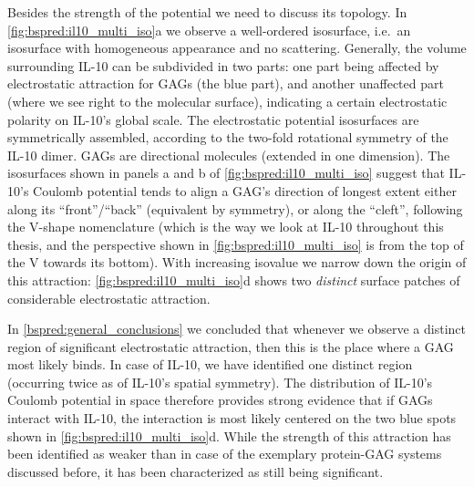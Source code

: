 Besides the strength of the potential we need to discuss its topology. In
\cref{fig:bspred:il10_multi_iso}a we observe a well-ordered isosurface, i.e.\ an
isosurface with homogeneous appearance and no scattering. Generally, the volume
surrounding IL-10 can be subdivided in two parts: one part being affected by
electrostatic attraction for GAGs (the blue part), and another unaffected part
(where we see right to the molecular surface), indicating a certain
electrostatic polarity on IL-10's global scale. The electrostatic potential
isosurfaces are symmetrically assembled, according to the two-fold rotational
symmetry of the IL-10 dimer. GAGs are directional molecules (extended in one
dimension). The isosurfaces shown in panels a and b of
\cref{fig:bspred:il10_multi_iso} suggest that IL-10's Coulomb potential tends to
align a GAG's direction of longest extent either along its
\enquote{front}/\enquote{back} (equivalent by symmetry), or along the
\enquote{cleft}, following the V-shape nomenclature (which is the way we look at
IL-10 throughout this thesis, and the perspective shown in
\cref{fig:bspred:il10_multi_iso} is from the top of the V towards its bottom).
With increasing isovalue we narrow down the origin of this attraction:
\cref{fig:bspred:il10_multi_iso}d shows two \textit{distinct} surface patches of
considerable electrostatic attraction.

In \cref{bspred:general_conclusions} we concluded that whenever we observe a
distinct region of significant electrostatic attraction, then this is the place
where a GAG most likely binds. In case of IL-10, we have identified one distinct
region (occurring twice as of IL-10's spatial symmetry). The distribution of
IL-10's Coulomb potential in space therefore provides strong evidence that if
GAGs interact with IL-10, the interaction is most likely centered on the two
blue spots shown in \cref{fig:bspred:il10_multi_iso}d. While the strength of
this attraction has been identified as weaker than in case of the exemplary
protein-GAG systems discussed before, it has been characterized as still being
significant.


